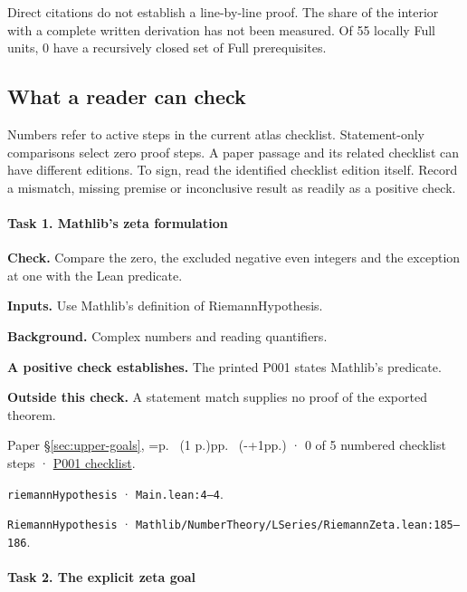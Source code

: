 Direct citations do not establish a line-by-line proof. The share of the interior with a complete written derivation has not been measured. Of 55 locally Full units, 0 have a recursively closed set of Full prerequisites.

\subsection{What a reader can check}\label{v7:q2}

Numbers refer to active steps in the current atlas checklist. Statement-only comparisons select zero proof steps. A paper passage and its related checklist can have different editions. To sign, read the identified checklist edition itself. Record a mismatch, missing premise or inconclusive result as readily as a positive check.

\paragraph{Task 1. Mathlib’s zeta formulation}\label{v7:task-1}

\textbf{Check.} Compare the zero, the excluded negative even integers and the exception at one with the Lean predicate.

\textbf{Inputs.} Use Mathlib’s definition of RiemannHypothesis.

\textbf{Background.} Complex numbers and reading quantifiers.

\textbf{A positive check establishes.} The printed P001 states Mathlib’s predicate.

\textbf{Outside this check.} A statement match supplies no proof of the exported theorem.

Paper \S\ref{sec:upper-goals}, \ifnum{}=\relax p.\ \pageref{pn:P001} (1 p.)\else pp.\ \pageref{pn:P001} (\number\numexpr{}-+1\relax pp.)\fi{} · 0 of 5 numbered checklist steps · \href{https://github.com/GunheeC/rh-lean-verification-atlas/blob/v0.1.0/units/P001.check.md}{P001 checklist}.

\nolinkurl{riemannHypothesis} · \nolinkurl{Main.lean:4–4}.

\nolinkurl{RiemannHypothesis} · \nolinkurl{Mathlib/NumberTheory/LSeries/RiemannZeta.lean:185–186}.

\paragraph{Task 2. The explicit zeta goal}\label{v7:task-2}

